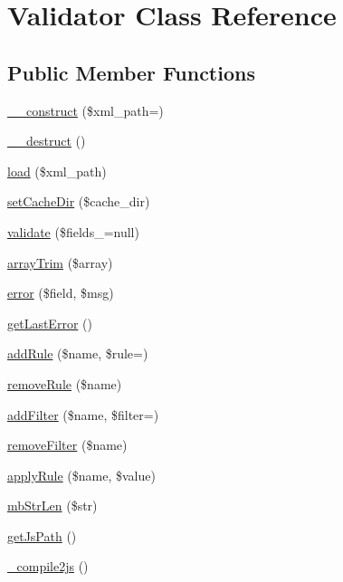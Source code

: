\hypertarget{classValidator}{}\section{Validator Class Reference}
\label{classValidator}
\subsection*{Public Member Functions}
\begin{DoxyCompactItemize}
\item 
\hyperlink{classValidator_aafbcea2a19ec19d087312937d3614251}{\+\_\+\+\_\+construct} (\$xml\+\_\+path=\textquotesingle{}\textquotesingle{})
\item 
\hyperlink{classValidator_aa076d09e847e8461281d4912688a9388}{\+\_\+\+\_\+destruct} ()
\item 
\hyperlink{classValidator_a43de0eb69cae01eee855f825324ffc39}{load} (\$xml\+\_\+path)
\item 
\hyperlink{classValidator_a1630131530dca60428e72dd4dd2d4af3}{set\+Cache\+Dir} (\$cache\+\_\+dir)
\item 
\hyperlink{classValidator_a05e34dac507b8d719e7f95f2cd0220bc}{validate} (\$fields\+\_\+=null)
\item 
\hyperlink{classValidator_ac4be365554a620a921f6846e80d76671}{array\+Trim} (\$array)
\item 
\hyperlink{classValidator_ad46fa003b320d64ef656b22de870782c}{error} (\$field, \$msg)
\item 
\hyperlink{classValidator_a3de1a1112e46b42ab6a89a4a13048504}{get\+Last\+Error} ()
\item 
\hyperlink{classValidator_ab58af6f21352ffb04d4f017bbd75c002}{add\+Rule} (\$name, \$rule=\textquotesingle{}\textquotesingle{})
\item 
\hyperlink{classValidator_acc2d2fd527f54e1fed839a927a83c6b8}{remove\+Rule} (\$name)
\item 
\hyperlink{classValidator_a6b29daf0d2704ebe4b530c6c4883419a}{add\+Filter} (\$name, \$filter=\textquotesingle{}\textquotesingle{})
\item 
\hyperlink{classValidator_a7613a0d6b468b5d5ade046a801b260db}{remove\+Filter} (\$name)
\item 
\hyperlink{classValidator_a8a8be8c74216e9d0ebbd99eb1e29b8d2}{apply\+Rule} (\$name, \$value)
\item 
\hyperlink{classValidator_a46de77869676b1b027a076c2106653e2}{mb\+Str\+Len} (\$str)
\item 
\hyperlink{classValidator_ae9037d1911390583a1358b25c03768e3}{get\+Js\+Path} ()
\item 
\hyperlink{classValidator_ae7b44a7a2bfb3ee4672b4cf2cdbd059f}{\+\_\+compile2js} ()
\end{DoxyCompactItemize}
